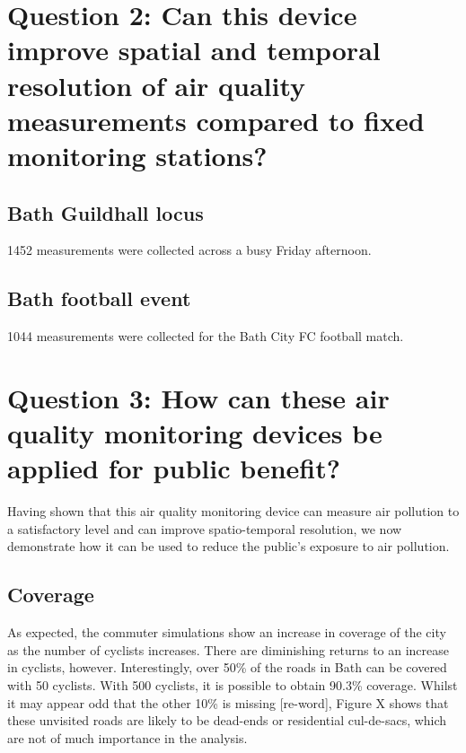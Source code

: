 \documentclass[11pt]{report}
\begin{document}
\section{Question 2: Can this device improve spatial and temporal resolution of air quality measurements compared to fixed monitoring stations?} \label{q2_results}

\subsection{Bath Guildhall locus}

\num{1452} measurements were collected across a busy Friday afternoon.

\subsection{Bath football event}

\num{1044} measurements were collected for the Bath City FC football match.


\section{Question 3: How can these air quality monitoring devices be applied for public benefit?} \label{q3_results}

Having shown that this air quality monitoring device can measure air pollution to a satisfactory level and can improve spatio-temporal resolution, we now demonstrate how it can be used to reduce the public's exposure to air pollution.

\subsection{Coverage}

As expected, the commuter simulations show an increase in coverage of the city as the number of cyclists increases. There are diminishing returns to an increase in cyclists, however. Interestingly, over 50\% of the roads in Bath can be covered with 50 cyclists. With 500 cyclists, it is possible to obtain 90.3\% coverage. Whilst it may appear odd that the other 10\% is missing [re-word], Figure X shows that these unvisited roads are likely to be dead-ends or residential cul-de-sacs, which are not of much importance in the analysis.

\end{document}
